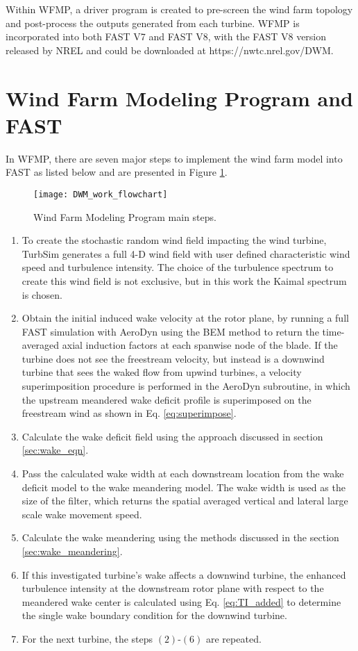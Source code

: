 \documentclass{umthesis}
\begin{document}
Within WFMP, a driver program is created to pre-screen the wind farm topology and post-process the outputs generated from each turbine. WFMP is incorporated into both FAST V7 and FAST V8, with the FAST V8 version released by NREL and could be downloaded at https://nwtc.nrel.gov/DWM.

\section{Wind Farm Modeling Program and FAST}
In WFMP, there are seven major steps to implement the wind farm model into FAST as listed below and are presented in Figure \ref{fig:DWM_work_flowchart}.
\begin{figure}
  \centering
  \texttt{[image: DWM\_work\_flowchart]}
  \caption{Wind Farm Modeling Program main steps.}\label{fig:DWM_work_flowchart}
\end{figure}


\begin{enumerate}
  \item To create the stochastic random wind field impacting the wind turbine, TurbSim generates a full 4-D wind field with user defined characteristic wind speed and turbulence intensity. The choice of the turbulence spectrum to create this wind field is not exclusive, but in this work the Kaimal spectrum is chosen.
  \item Obtain the initial induced wake velocity at the rotor plane, by running a full FAST simulation with AeroDyn using the BEM method to return the time-averaged axial induction factors at each spanwise node of the blade. If the turbine does not see the freestream velocity, but instead is a downwind turbine that sees the waked flow from upwind turbines, a velocity superimposition procedure is performed in the AeroDyn subroutine, in which the upstream meandered wake deficit profile is superimposed on the freestream wind as shown in Eq. \ref{eq:superimpose}.
  \item Calculate the wake deficit field using the approach discussed in section \ref{sec:wake_eqn}.
  \item Pass the calculated wake width at each downstream location from the wake deficit model to the wake meandering model. The wake width is used as the size of the filter, which returns the spatial averaged vertical and lateral large scale wake movement speed.
  \item Calculate the wake meandering using the methods discussed in the section \ref{sec:wake_meandering}.
  \item If this investigated turbine's wake affects a downwind turbine, the enhanced turbulence intensity at the downstream rotor plane with respect to the meandered wake center is calculated using Eq. \ref{eq:TI_added} to determine the single wake boundary condition for the downwind turbine.
  \item For the next turbine, the steps $(2)$-$(6)$ are repeated.
\end{enumerate}
\end{document}
